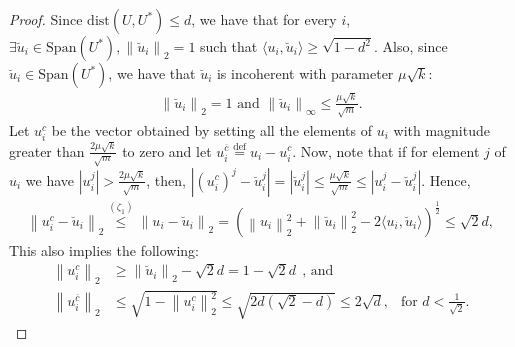 \documentclass[11pt]{article}
\theoremstyle{plain}
\theoremstyle{definition}
\newcommand{\iprod}[2]{\langle #1, #2 \rangle}
\newcommand{\eqdef}{\stackrel{\textrm{def}}{=}}
\newcommand{\dist}{\mathrm{dist}}
\newcommand{\twonorm}[1]{\left\| {#1} \right\|_2}
\newcommand{\infnorm}[1]{\left\| {#1} \right\|_{\infty}}
\begin{document}
\begin{proof}
  Since $\dist\left(U,U^*\right) \leq d$, we have that for every $i$, $\exists \breve{u}_i \in \textrm{Span}(U^*), \twonorm{\breve{u}_i}=1$ such that
 $\iprod{u_i}{\breve{u}_i} \geq \sqrt{1-d^2}$. Also, since $\breve{u}_i \in \textrm{Span}(U^*)$, we have that $\breve{u}_i$
 is incoherent with parameter $\mu \sqrt{k}$:
\begin{align*}
  \twonorm{\breve{u}_i}=1 \mbox{ and }
  \infnorm{\breve{u}_i} \leq \frac{\mu \sqrt{k}}{\sqrt{m}}.
\end{align*}
Let $u_i^c$ be the vector obtained by setting all the elements of $u_i$ with magnitude greater than $\frac{2\mu\sqrt{k}}{\sqrt{m}}$ to zero and let
$u_i^{\overline{c}} \eqdef u_i - u_i^c$. 
Now, note that if for element $j$ of $u_i$ we have $\left|u_{i}^j\right| > \frac{2\mu\sqrt{k}}{\sqrt{m}}$, then, $|(u_{i}^c)^j-\breve{u}_i^j|=\left|\breve{u}_i^j\right|\leq \frac{\mu\sqrt{k}}{\sqrt{m}} \leq \left|u_i^j - \breve{u}_i^j\right|$. Hence, 
\begin{align*}
  \twonorm{u_i^c - \breve{u}_i} \stackrel{(\zeta_1)}{\leq} \twonorm{u_i - \breve{u}_i}
	= \left(\twonorm{u_i}^2 + \twonorm{\breve{u}_i}^2 - 2 \iprod{u_i}{\breve{u}_i}\right)^{\frac{1}{2}} \leq \sqrt{2}d,
\end{align*}
This also implies the following:
\begin{align*}
  \twonorm{u_i^c} &\geq \twonorm{\breve{u}_i} - \sqrt{2}d = 1 - \sqrt{2}d\ \ \mbox{, and }\\
  \twonorm{u_i^{\overline{c}}} &\leq \sqrt{1 - \twonorm{u_i^c}^2} \leq \sqrt{2d(\sqrt{2}-d)} \leq 2 \sqrt{d},\ \  \mbox{ for } d < \frac{1}{\sqrt{2}}.
\end{align*}


\end{proof}
\end{document}
